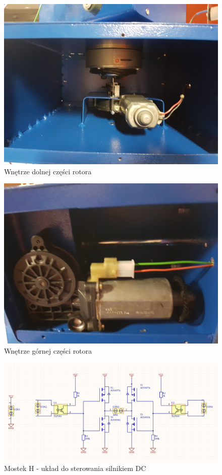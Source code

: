 \begin{figure}[!htbp]
 \includegraphics[width=\textwidth]{rotor_dol}
 \centering
 \caption{Wnętrze dolnej części rotora}
 \label{rotdol}
\end{figure}

\begin{figure}[!htbp]
 \includegraphics[width=\textwidth]{rotor_gora}
 \centering
 \caption{Wnętrze górnej części rotora}
 \label{rotgora}
\end{figure}

\begin{figure}[!htbp]
 \includegraphics[width=\textwidth]{mostekh}
 \centering
 \caption{Mostek H - układ do sterowania silnikiem DC}
 \label{mostekh}
\end{figure}

